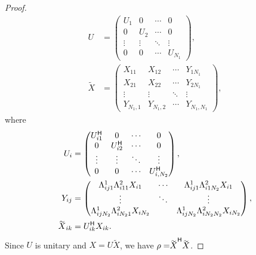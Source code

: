 \begin{proof}
\begin{equation}
\begin{split}
       U & =
       \begin{pmatrix}
         U_1 & 0 & \cdots & 0\\
         0 & U_2 & \cdots & 0\\
         \vdots & \vdots &\ddots& \vdots \\
         0 & 0 & \cdots & U_{N_1}
       \end{pmatrix},\\
       \tilde X &=
       \begin{pmatrix}
         X_{11} & X_{12} & \cdots &Y_{1N_1 } \\
         X_{21} & X_{22} & \cdots & Y_{2 N_1} \\
         \vdots & \vdots & \ddots & \vdots \\
         Y_{N_1,1} & Y_{N_1,2} & \cdots & Y_{N_1, N_1}
       \end{pmatrix},
       \end{split}
     \end{equation}
     where
     \begin{align*}
       U_i &=
             \begin{pmatrix}
               \adj U_{i1} & 0 & \cdots & 0\\
               0 & \adj U_{i2} & \cdots & 0\\
               \vdots & \vdots &\ddots& \vdots \\
               0 & 0 & \cdots & \adj U_{i,N_2}
             \end{pmatrix},\\
       Y_{ij} &=
                \begin{pmatrix}
                 \Lambda_{ij1}^1\Lambda_{i11}^2X_{i1} &\cdots &\Lambda_{ij1}^1\Lambda_{i1N_2}^2X_{i1}\\
                  \vdots&\ddots&\vdots\\
                  \Lambda_{ijN_2}^1\Lambda_{iN_21}^2X_{iN_2}&&\Lambda_{ijN_2}^1\Lambda_{iN_2N_2}^2X_{iN_2}
                \end{pmatrix},\\
       \tilde X_{ik}& = \adj U_{ik}X_{ik}.
     \end{align*}
     Since $U$ is unitary and $X = U\tilde X$, we have $\rho= \adj{\tilde X} \tilde X$.


\end{proof}
